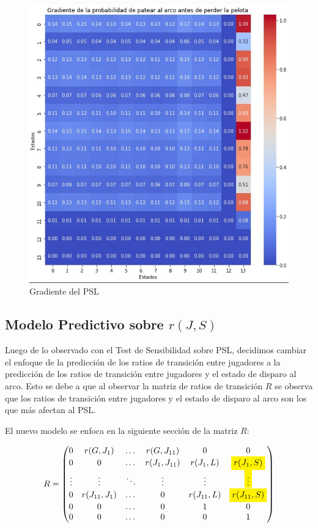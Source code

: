 \documentclass[
  a4paper,
]{article}
\begin{document}
\begin{figure}
\centering
\includegraphics{recursos_pdf/graficos/psl_gradient.jpeg}
\caption{Gradiente del PSL}
\end{figure}

\hypertarget{modelo-predictivo-sobre-rj-s}{%
\subsection{\texorpdfstring{Modelo Predictivo sobre
\(r(J, S)\)}{Modelo Predictivo sobre r(J, S)}}\label{modelo-predictivo-sobre-rj-s}}

Luego de lo observado con el Test de Sensibilidad sobre PSL, decidimos
cambiar el enfoque de la predicción de los ratios de transición entre
jugadores a la predicción de los ratios de transición entre jugadores y
el estado de disparo al arco. Esto se debe a que al observar la matriz
de ratios de transición \(R\) se observa que los ratios de transición
entre jugadores y el estado de disparo al arco son los que más afectan
al PSL.

El nuevo modelo se enfoca en la siguiente sección de la matriz \(R\):

\[
    R = \begin{pmatrix}
        0 & r(G, J_{1}) & \dots & r(G, J_{11}) & 0 & 0 \\
        0 & 0 & \dots & r(J_{1}, J_{11}) & r(J_{1}, L) & \colorbox{yellow}{$r(J_{1}, S)$} \\
        \vdots & \vdots & \ddots & \vdots & \vdots & \colorbox{yellow}{$\vdots$} \\
        0 & r(J_{11}, J_{1}) & \dots & 0 & r(J_{11}, L) & \colorbox{yellow}{$r(J_{11}, S)$} \\
        0 & 0 & \dots & 0 & 1 & 0 \\
        0 & 0 & \dots & 0 & 0 & 1 \\
    \end{pmatrix}
\]
\end{document}

